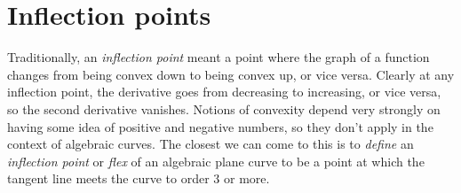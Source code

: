 \chapter{Inflection points}

Traditionally, an \emph{inflection point} meant a point where the graph of a function changes from being convex down to being convex up, or vice versa.
Clearly at any inflection point, the derivative goes from decreasing to increasing, or vice versa, so the second derivative vanishes.
Notions of convexity depend very strongly on having some idea of positive and negative numbers, so they don't apply in the context of algebraic curves.
The closest we can come to this is to \emph{define} an \emph{inflection point} or \emph{flex} of an algebraic plane curve to be a point at which the tangent line meets the curve to order \(3\) or more.


